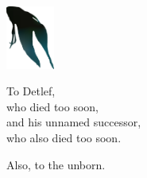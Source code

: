 

\begin{center}
\includegraphics[width=0.12\textwidth]{frontmatter/detlef.pdf}

\vspace{4em}

\noindent To Detlef,\\
who died too soon,\\
and his unnamed successor,\\
who also died too soon.

\vspace{4em}

Also, to the unborn.
\end{center}
